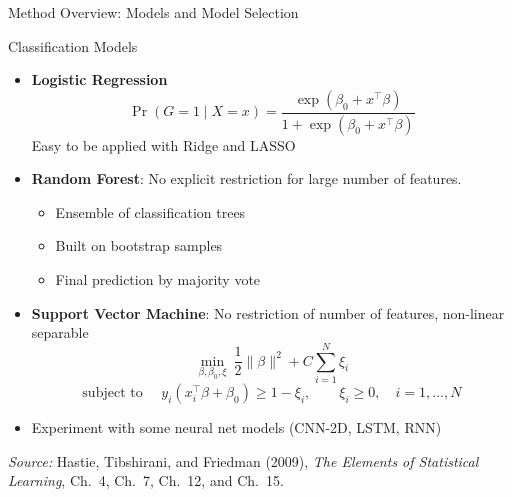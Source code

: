 \documentclass[aspectratio=169,t]{beamer} %
\begin{document}
\begin{frame}[t,shrink=8]{Method Overview: Models and Model Selection}

\begin{block}{Classification Models}
\begin{itemize}
    \item \textbf{Logistic Regression}
    \[
    \Pr(G=1\mid X=x)
    =
    \frac{\exp(\beta_0+x^\top\beta)}
    {1+\exp(\beta_0+x^\top\beta)}
    \]
    Easy to be applied with Ridge and LASSO
    \item \textbf{Random Forest}: No explicit restriction for large number of features.
    \begin{itemize}
        \item Ensemble of classification trees
        \item Built on bootstrap samples
        \item Final prediction by majority vote
    \end{itemize}
    
    \item \textbf{Support Vector Machine}: No restriction of number of features, non-linear separable
    \[
    \min_{\beta,\beta_0,\xi}\ 
    \frac{1}{2}\|\beta\|^2 + C\sum_{i=1}^N \xi_i
    \]
    \[
    \text{subject to } \quad
    y_i(x_i^\top\beta+\beta_0)\ge 1-\xi_i,\qquad
    \xi_i\ge 0,\quad i=1,\dots,N
    \]

    \item Experiment with some neural net models (CNN-2D, LSTM, RNN) 
    
\end{itemize}
\end{block}

\vfill
{\tiny \textit{Source:} Hastie, Tibshirani, and Friedman (2009), \textit{The Elements of Statistical Learning}, Ch.~4, Ch.~7, Ch.~12, and Ch.~15.}

\end{frame}
\end{document}

